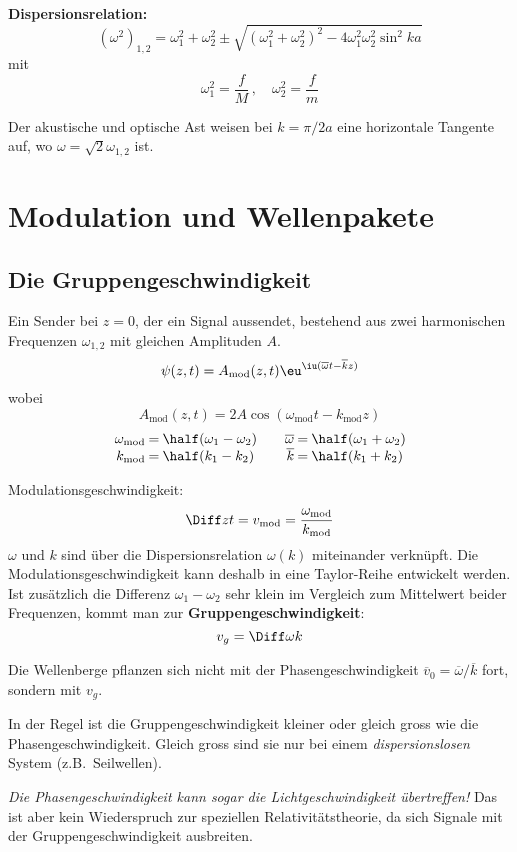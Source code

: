 		\textbf{Dispersionsrelation:}
		\[
			(\omega^2)_{1,2} = \omega_1^2 + \omega_2^2 \pm \sqrt{(\omega_1^2 + \omega_2^2)^2 - 4\omega_1^2 \omega_2^2 \sin^2 ka}
		\]
		mit
		\[
			\omega_1^2 = \frac f M \,,\quad \omega_2^2 = \frac f m
		\]
		
		Der akustische und optische Ast weisen bei $k = \pi/2a$ eine horizontale Tangente auf, wo $\omega = \sqrt{2} \omega_{1,2}$ ist.
\section{Modulation und Wellenpakete} %
	\subsection{Die Gruppengeschwindigkeit} %
		Ein Sender bei $z = 0$, der ein Signal aussendet, bestehend aus zwei harmonischen Frequenzen $\omega_{1,2}$ mit gleichen Amplituden $A$.
		\[
			\psi(z,t) = A_\text{mod}(z,t) \eu^{\iu (\overline\omega t - \overline k z)}
		\]
		wobei
		\[
			A_\text{mod}(z,t) = 2A \cos(\omega_\text{mod} t - k_\text{mod} z)
		\]
		\[
			\begin{array}{r@{\:=\:}l@{\qquad}r@{\:=\:}l}
				\omega_\text{mod} & \half (\omega_1 - \omega_2) &
				\overline\omega & \half (\omega_1 + \omega_2) \\
				k_\text{mod} & \half (k_1 - k_2) &
				\overline k & \half (k_1 + k_2)
			\end{array}
		\]
		
		Modulationsgeschwindigkeit:
		\[
			\Diff z t = v_\text{mod} = \frac{\omega_\text{mod}}{k_\text{mod}}
		\]
		$\omega$ und $k$ sind über die Dispersionsrelation $\omega(k)$ miteinander verknüpft. Die Modulationsgeschwindigkeit kann deshalb in eine Taylor-Reihe entwickelt werden. Ist zusätzlich die Differenz $\omega_1 - \omega_2$ sehr klein im Vergleich zum Mittelwert beider Frequenzen, kommt man zur \textbf{Gruppengeschwindigkeit}:
		\[
			v_g = \Diff \omega k
		\]
		
		Die Wellenberge pflanzen sich nicht mit der Phasengeschwindigkeit $\overline v_0 = \overline \omega/\overline k$ fort, sondern mit $v_g$.
		
		In der Regel ist die Gruppengeschwindigkeit kleiner oder gleich gross wie die Phasengeschwindigkeit. Gleich gross sind sie nur bei einem \emph{dispersionslosen} System (z.B.~Seilwellen).
		
		\emph{Die Phasengeschwindigkeit kann sogar die Lichtgeschwindigkeit übertreffen!} Das ist aber kein Wiederspruch zur speziellen Relativitätstheorie, da sich Signale mit der Gruppengeschwindigkeit ausbreiten.
